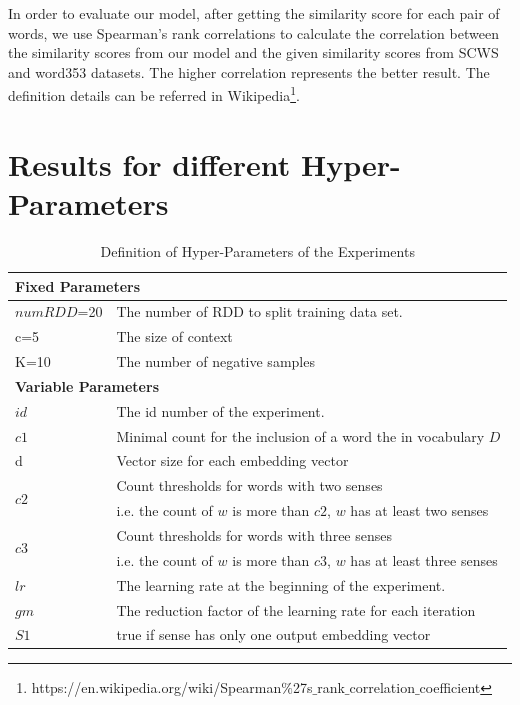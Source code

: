 In order to evaluate our model, after getting the similarity score for each pair of words, we use Spearman’s rank correlations to calculate the correlation between the similarity scores from our model and the given similarity scores from SCWS and word353 datasets. The higher correlation represents the better result. The definition details can be referred in Wikipedia\footnote{https://en.wikipedia.org/wiki/Spearman$\%$27s$\_$rank$\_$correlation$\_$coefficient}. 



\section{Results for different Hyper-Parameters}

\begin{table}[tb]
	\caption{Definition of Hyper-Parameters of the Experiments } \label{tab:notationhyper}
	\begin{center}
		\begin{tabular}{|l|l|}
			\hline
			\multicolumn{2}{|l|}{\bf Fixed Parameters}  \\ \hline
			$numRDD$=20 & The number of RDD to split training data set.\\ \hline
			\gls{c}=5& The size of context  \\ \hline
			\gls{K}=10& The number of negative samples\\ \hline
			\multicolumn{2}{|l|}{\bf Variable Parameters}  \\ \hline
			$id$ & The id number of the experiment. \\ \hline
			$c1$ &  Minimal count for the inclusion of a word the in vocabulary $D$\\ \hline
			\gls{d} & Vector size for each embedding vector  \\ \hline
			\multirow{2}{*}{$c2$} 
			&  Count thresholds for words with two senses\\
			&  i.e. the count of $w$ is more than $c2$, $w$ has at least two senses\\ 
			\hline
			\multirow{2}{*}{$c3$} 
			&  Count thresholds for words with three senses\\
			&  i.e. the count of $w$ is more than $c3$, $w$ has at least three senses\\ \hline
			$lr$ &  The learning rate at the beginning of the experiment.\\ \hline
			$gm$ &  The reduction factor of the learning rate for each iteration\\ \hline
			$S1$ & true if sense has only one output embedding vector\\ 
			\hline
		\end{tabular}
	\end{center}
\end{table}



